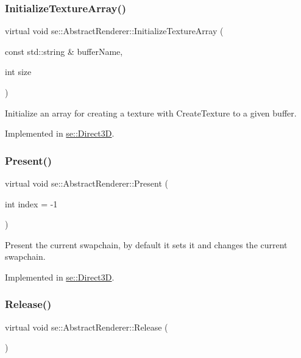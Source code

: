 \subsubsection{\texorpdfstring{Initialize\+Texture\+Array()}{InitializeTextureArray()}}
{\footnotesize\ttfamily virtual void se\+::\+Abstract\+Renderer\+::\+Initialize\+Texture\+Array (\begin{DoxyParamCaption}\item[{const std\+::string \&}]{buffer\+Name,  }\item[{int}]{size }\end{DoxyParamCaption})\hspace{0.3cm}{\ttfamily [pure virtual]}}

Initialize an array for creating a texture with Create\+Texture to a given buffer. 

Implemented in \mbox{\hyperlink{classse_1_1_direct3_d_a7d5db09c1cf0c5c45f61c631b174fcf2}{se\+::\+Direct3D}}.

\mbox{\label{classse_1_1_abstract_renderer_a5102e4df9100f6c0df9c26beaca6c4e4}} 
\subsubsection{\texorpdfstring{Present()}{Present()}}
{\footnotesize\ttfamily virtual void se\+::\+Abstract\+Renderer\+::\+Present (\begin{DoxyParamCaption}\item[{int}]{index = {\ttfamily -\/1} }\end{DoxyParamCaption})\hspace{0.3cm}{\ttfamily [pure virtual]}}

Present the current swapchain, by default it sets it and changes the current swapchain. 

Implemented in \mbox{\hyperlink{classse_1_1_direct3_d_a8fcf9f471230162031c50080bf8e44b5}{se\+::\+Direct3D}}.

\mbox{\label{classse_1_1_abstract_renderer_a98e35b7db62827580573185ed91b25bb}} 
\subsubsection{\texorpdfstring{Release()}{Release()}\hspace{0.1cm}{\footnotesize\ttfamily [1/2]}}
{\footnotesize\ttfamily virtual void se\+::\+Abstract\+Renderer\+::\+Release (\begin{DoxyParamCaption}{ }\end{DoxyParamCaption})\hspace{0.3cm}{\ttfamily [pure virtual]}}

